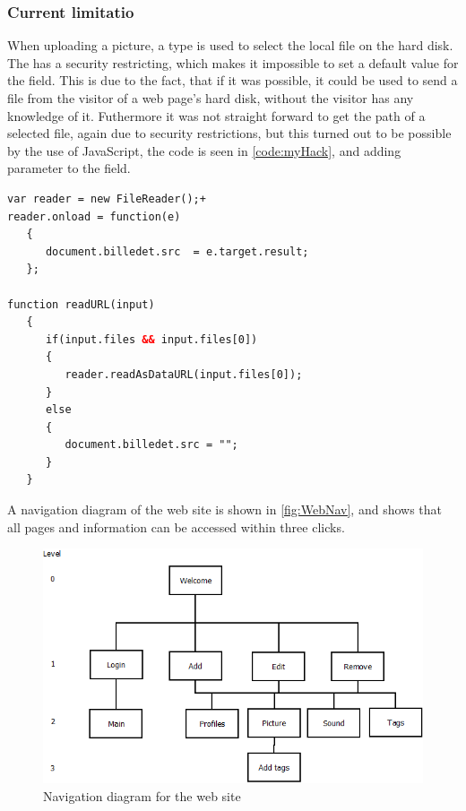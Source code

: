 \subsubsection{Current limitatio}
When uploading a picture, a  type is used to select the local file on the hard disk. The  has a security restricting, which makes it impossible to set a default value for the field. This is due to the fact, that if it was possible, it could be used to send a file from the visitor of a web page's hard disk, without the visitor has any knowledge of it\cite{noFile}. Futhermore it was not straight forward to get the path of a selected file, again due to security restrictions, but this turned out to be possible by the use of JavaScript, the code is seen in \autoref{code:myHack}, and adding parameter  to the  field.

\begin{lstlisting}[language=HTML,label=code:myHack,caption=Hack to load file from \code{file} box]
var reader = new FileReader();+
reader.onload = function(e) 
   {
      document.billedet.src  = e.target.result;
   };

function readURL(input)
   {
      if(input.files && input.files[0])
      {
         reader.readAsDataURL(input.files[0]);
      }
      else 
      {
         document.billedet.src = "";
      }
   }
\end{lstlisting}

A navigation diagram of the web site is shown in \autoref{fig:WebNav}, and shows that all pages and information can be accessed within three clicks.

\begin{figure}
	\centering
		\includegraphics[width=1.00\textwidth]{images/WebNav.png}
	\caption{Navigation diagram for the web site}
	\label{fig:WebNav}
\end{figure}
